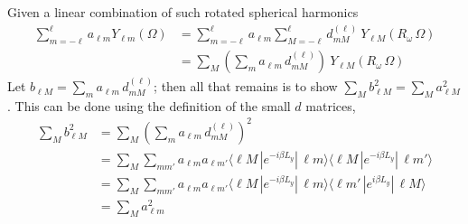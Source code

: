 \documentclass[aps,prl,preprint,groupedaddress]{revtex4-1}
\begin{document}
Given a linear combination of such rotated spherical harmonics
\begin{align*}
\sum_{m=-\ell}^{\ell} a_{\ell m} Y_{\ell m} (\Omega) &= 
\sum_{m=-\ell}^{\ell} a_{\ell m} \sum_{M=-\ell}^{\ell} d^{(\ell)}_{mM} \> Y_{\ell M} ( R_\omega \, \Omega ) \\
&= \sum_{M} \left( \sum_{m} a_{\ell m} \, d^{(\ell)}_{mM} \right) \> Y_{\ell M} ( R_\omega \, \Omega )
\end{align*}
Let $b_{\ell M} =  \sum_{m} a_{\ell m} \, d^{(\ell)}_{mM}$; then all that remains is to show $\sum_M b_{\ell M}^2 = \sum_M a_{\ell M}^2$. This can be done using the definition of the small $d$ matrices,
\begin{align*}
\sum_M b_{\ell M}^2 &= \sum_M \left( \sum_{m} a_{\ell m} \, d^{(\ell)}_{mM} \right)^2 \\
&= \sum_M  \sum_{m m'} a_{\ell m} a_{\ell m'} \langle \ell M \, | e^{-i \beta L_y} | \, \ell m \rangle \langle \ell M \, | e^{-i \beta L_y} | \, \ell m' \rangle \\
&= \sum_M  \sum_{m m'} a_{\ell m} a_{\ell m'} 
\langle \ell M \, | e^{-i \beta L_y} | \, \ell m \rangle 
\langle \ell m' \, | e^{i \beta L_y} | \, \ell M \rangle \\
&= \sum_M a_{\ell m}^2
\end{align*}









\end{document}
